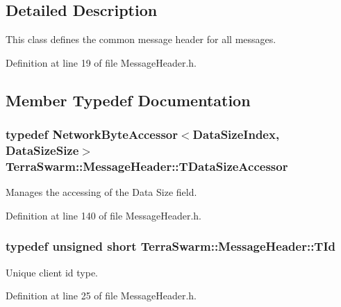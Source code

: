 \subsection{Detailed Description}
This class defines the common message header for all messages. 

Definition at line 19 of file Message\-Header.\-h.



\subsection{Member Typedef Documentation}
\hypertarget{class_terra_swarm_1_1_message_header_aed583369adabf273cabc86e379229537}{
\subsubsection[{T\-Data\-Size\-Accessor}]{\setlength{\rightskip}{0pt plus 5cm}typedef {\bf Network\-Byte\-Accessor}$<${\bf Data\-Size\-Index}, {\bf Data\-Size\-Size}$>$ {\bf Terra\-Swarm\-::\-Message\-Header\-::\-T\-Data\-Size\-Accessor}\hspace{0.3cm}{\ttfamily [private]}}}\label{class_terra_swarm_1_1_message_header_aed583369adabf273cabc86e379229537}


Manages the accessing of the Data Size field. 



Definition at line 140 of file Message\-Header.\-h.

\hypertarget{class_terra_swarm_1_1_message_header_ab55de822fadad758edcd8f36bd07676e}{
\subsubsection[{T\-Id}]{\setlength{\rightskip}{0pt plus 5cm}typedef unsigned short {\bf Terra\-Swarm\-::\-Message\-Header\-::\-T\-Id}}}\label{class_terra_swarm_1_1_message_header_ab55de822fadad758edcd8f36bd07676e}


Unique client id type. 



Definition at line 25 of file Message\-Header.\-h.


